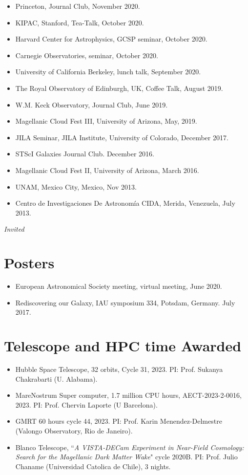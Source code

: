 \documentclass[14pt]{article}
\begin{document}
\begin{itemize}
\item Princeton, Journal Club, November 2020. \dag
\item KIPAC, Stanford, Tea-Talk, October 2020.
\item Harvard Center for Astrophysics, GCSP seminar, October 2020.
\item Carnegie Observatories, seminar, October 2020. \dag
\item University of California Berkeley, lunch talk, September 2020. 
\item The Royal Observatory of Edinburgh, UK, Coffee Talk, August 2019. \dag
\item W.M. Keck Observatory, Journal Club, June 2019.
\item Magellanic Cloud Fest III, University of Arizona, May, 2019.
\item JILA Seminar, JILA Institute, University of Colorado, December 2017.
\item STScI Galaxies Journal Club. December 2016.
\item Magellanic Cloud Fest II, University of Arizona, March 2016.
\item UNAM, Mexico City, Mexico, Nov 2013. 
\item Centro de Investigaciones De Astronom\'ia CIDA, Merida, Venezuela, July 2013.
\end{itemize}
\indent \dag \textit{Invited}

\section*{Posters}
\begin{itemize}
\setlength\itemsep{0.0em}
\renewcommand\labelitemi{$\cdot$}
  \item European Astronomical Society meeting, virtual meeting, June 2020.
  \item Rediscovering our Galaxy, IAU symposium 334, Potsdam, Germany. July 2017.
\end{itemize}

\section*{Telescope and HPC time Awarded}
\begin{itemize}
  \setlength\itemsep{0.0em}
  \renewcommand\labelitemi{$\cdot$}
\item Hubble Space Telescope, 32 orbits, Cycle 31, 2023. PI: Prof. Sukanya Chakrabarti (U. Alabama). 
\item MareNostrum Super computer, 1.7 million CPU hours, AECT-2023-2-0016, 2023.
  PI: Prof. Chervin Laporte (U Barcelona). 
\item GMRT 60 hours cycle 44, 2023. PI: Prof. Karin Menendez-Delmestre (Valongo Observatory, Rio de Janeiro).
\item Blanco Telescope, ``\textit{A VISTA-DECam Experiment in Near-Field
  Cosmology: Search for the Magellanic Dark Matter Wake}" cycle 2020B. PI: Prof. Julio
  Chaname (Universidad Catolica de Chile), 3 nights.
\end{itemize}
\end{document}
